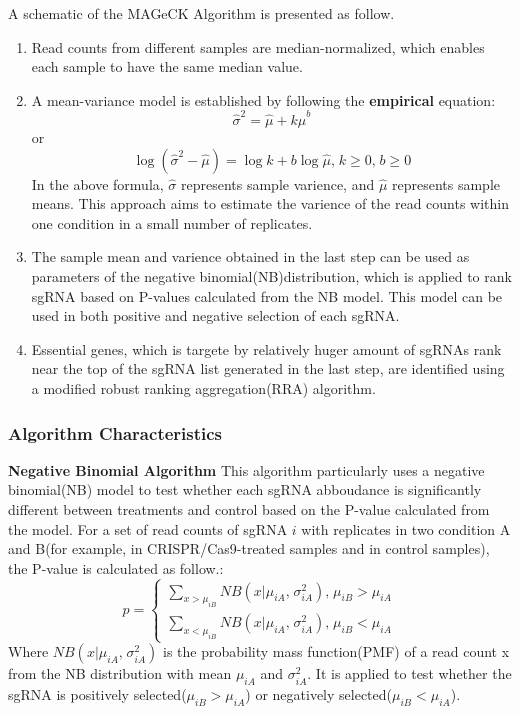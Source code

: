 \documentclass[fleqn,10pt]{wlscirep}
\begin{document}
A schematic of the MAGeCK Algorithm is presented as follow\cite{li2014mageck}.
\begin{enumerate}
    \item Read counts from different samples are median-normalized, which enables each sample to have the same median value.
    \item A mean-variance model is established by following the \textbf{empirical} equation:
        \begin{equation}
           \hat{\sigma}^2=\hat{\mu}+k\hat{\mu}^b
        \end{equation}
        or
        \begin{equation}
            \log{(\hat{\sigma}^2-\hat{\mu})}=\log{k}+b\log{\hat{\mu}}\textrm{,}\; k\geqslant{0} \textrm{,}\;b\geqslant{0}
         \end{equation}
        In the above formula, $\hat{\sigma}$ represents sample varience, and $\hat{\mu}$ represents sample means.  This approach aims to estimate the varience of the read counts within one condition in a small number of replicates.
    \item The sample mean and varience obtained in the last step can be used as parameters of the negative binomial(NB)distribution, which is applied to rank sgRNA based on P-values calculated from the NB model.  This model can be used in both positive and negative selection of each sgRNA.
    \item Essential genes, which is targete by relatively huger amount of sgRNAs rank near the top of the sgRNA list generated in the last step, are identified using a modified robust ranking aggregation(RRA) algorithm.
    \end{enumerate}

\subsubsection*{Algorithm Characteristics}
\textbf{Negative Binomial Algorithm}
This algorithm particularly uses a negative binomial(NB) model to test whether each sgRNA abboudance is significantly different between treatments and control based on the P-value calculated from the model\cite{li2014mageck}. 
For a set of read counts of sgRNA $i$ with replicates in two condition A and B(for example, in CRISPR/Cas9-treated samples and in control samples), the P-value is calculated as follow\cite{li2014mageck}.:
\begin{equation}
    p=\left\{
\begin{aligned}
\sum_{x>\mu_{iB}}NB(x|\mu_{iA}\textrm{,}\;\sigma^2_{iA}) \textrm{,}\;\mu_{iB}>\mu_{iA}\\
\sum_{x<\mu_{iB}}NB(x|\mu_{iA}\textrm{,}\;\sigma^2_{iA}) \textrm{,}\;\mu_{iB}<\mu_{iA} 
\end{aligned}
\right.
\end{equation}
Where $NB(x|\mu_{iA}\textrm{,}\;\sigma^2_{iA})$ is the probability mass function(PMF) of a read count x from the NB distribution with mean $\mu_{iA}$ and $\sigma^2_{iA}$. It is applied to test whether the sgRNA is positively selected($\mu_{iB}>\mu_{iA}$) or negatively selected($\mu_{iB}<\mu_{iA}$).
\end{document}

